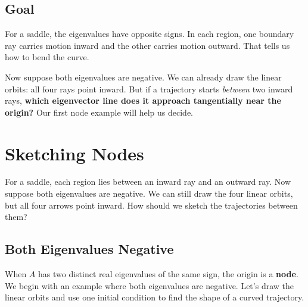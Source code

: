 \documentclass[10pt,letterpaper]{article}
\begin{document}
\begin{center}
\begin{minipage}[t]{.32\linewidth}
{
}
\end{minipage}
\endgroup
\end{center}

\subsection{Goal}

For a saddle, the eigenvalues have opposite signs. In each region,
one boundary ray carries motion inward and the other carries motion
outward. That tells us how to bend the curve.

Now suppose both eigenvalues are negative. We can already draw the
linear orbits: all four rays point inward. But if a trajectory starts
\emph{between} two inward rays, \textbf{which eigenvector line does it
approach tangentially near the origin?} Our first node example will
help us decide.


\section{Sketching Nodes}

For a saddle, each region lies between an inward ray and an outward ray.
Now suppose both eigenvalues are negative. We can still draw the four
linear orbits, but all four arrows point inward. How should we sketch
the trajectories between them?

\subsection{Both Eigenvalues Negative}

When $A$ has two distinct real eigenvalues of the same sign, the origin
is a \textbf{node}. We begin with an example where both
eigenvalues are negative. Let's draw the linear orbits and use one
initial condition to find the shape of a curved trajectory.
\end{document}
